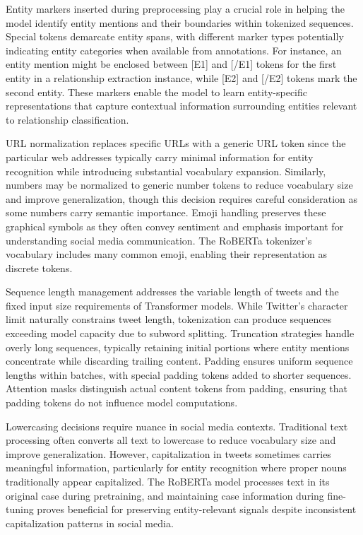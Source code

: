 \documentclass[12pt,a4paper]{report}
\begin{document}
Entity markers inserted during preprocessing play a crucial role in helping the model identify entity mentions and their boundaries within tokenized sequences. Special tokens demarcate entity spans, with different marker types potentially indicating entity categories when available from annotations. For instance, an entity mention might be enclosed between [E1] and [/E1] tokens for the first entity in a relationship extraction instance, while [E2] and [/E2] tokens mark the second entity. These markers enable the model to learn entity-specific representations that capture contextual information surrounding entities relevant to relationship classification.

URL normalization replaces specific URLs with a generic URL token since the particular web addresses typically carry minimal information for entity recognition while introducing substantial vocabulary expansion. Similarly, numbers may be normalized to generic number tokens to reduce vocabulary size and improve generalization, though this decision requires careful consideration as some numbers carry semantic importance. Emoji handling preserves these graphical symbols as they often convey sentiment and emphasis important for understanding social media communication. The RoBERTa tokenizer's vocabulary includes many common emoji, enabling their representation as discrete tokens.

Sequence length management addresses the variable length of tweets and the fixed input size requirements of Transformer models. While Twitter's character limit naturally constrains tweet length, tokenization can produce sequences exceeding model capacity due to subword splitting. Truncation strategies handle overly long sequences, typically retaining initial portions where entity mentions concentrate while discarding trailing content. Padding ensures uniform sequence lengths within batches, with special padding tokens added to shorter sequences. Attention masks distinguish actual content tokens from padding, ensuring that padding tokens do not influence model computations.

Lowercasing decisions require nuance in social media contexts. Traditional text processing often converts all text to lowercase to reduce vocabulary size and improve generalization. However, capitalization in tweets sometimes carries meaningful information, particularly for entity recognition where proper nouns traditionally appear capitalized. The RoBERTa model processes text in its original case during pretraining, and maintaining case information during fine-tuning proves beneficial for preserving entity-relevant signals despite inconsistent capitalization patterns in social media.
\end{document}
